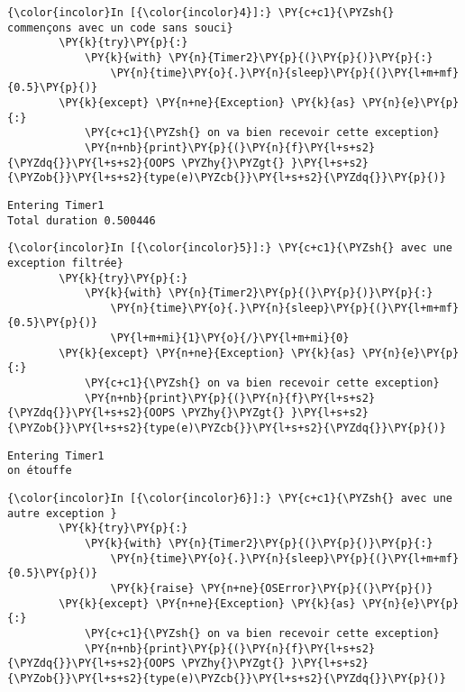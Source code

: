     \begin{Verbatim}[commandchars=\\\{\},frame=single,framerule=0.3mm,rulecolor=\color{cellframecolor}]
{\color{incolor}In [{\color{incolor}4}]:} \PY{c+c1}{\PYZsh{} commençons avec un code sans souci}
        \PY{k}{try}\PY{p}{:}
            \PY{k}{with} \PY{n}{Timer2}\PY{p}{(}\PY{p}{)}\PY{p}{:}
                \PY{n}{time}\PY{o}{.}\PY{n}{sleep}\PY{p}{(}\PY{l+m+mf}{0.5}\PY{p}{)}
        \PY{k}{except} \PY{n+ne}{Exception} \PY{k}{as} \PY{n}{e}\PY{p}{:}
            \PY{c+c1}{\PYZsh{} on va bien recevoir cette exception}
            \PY{n+nb}{print}\PY{p}{(}\PY{n}{f}\PY{l+s+s2}{\PYZdq{}}\PY{l+s+s2}{OOPS \PYZhy{}\PYZgt{} }\PY{l+s+s2}{\PYZob{}}\PY{l+s+s2}{type(e)\PYZcb{}}\PY{l+s+s2}{\PYZdq{}}\PY{p}{)}
\end{Verbatim}


    \begin{Verbatim}[commandchars=\\\{\},frame=single,framerule=0.3mm,rulecolor=\color{cellframecolor}]
Entering Timer1
Total duration 0.500446
\end{Verbatim}

    \begin{Verbatim}[commandchars=\\\{\},frame=single,framerule=0.3mm,rulecolor=\color{cellframecolor}]
{\color{incolor}In [{\color{incolor}5}]:} \PY{c+c1}{\PYZsh{} avec une exception filtrée}
        \PY{k}{try}\PY{p}{:}
            \PY{k}{with} \PY{n}{Timer2}\PY{p}{(}\PY{p}{)}\PY{p}{:}
                \PY{n}{time}\PY{o}{.}\PY{n}{sleep}\PY{p}{(}\PY{l+m+mf}{0.5}\PY{p}{)}
                \PY{l+m+mi}{1}\PY{o}{/}\PY{l+m+mi}{0}
        \PY{k}{except} \PY{n+ne}{Exception} \PY{k}{as} \PY{n}{e}\PY{p}{:}
            \PY{c+c1}{\PYZsh{} on va bien recevoir cette exception}
            \PY{n+nb}{print}\PY{p}{(}\PY{n}{f}\PY{l+s+s2}{\PYZdq{}}\PY{l+s+s2}{OOPS \PYZhy{}\PYZgt{} }\PY{l+s+s2}{\PYZob{}}\PY{l+s+s2}{type(e)\PYZcb{}}\PY{l+s+s2}{\PYZdq{}}\PY{p}{)}
\end{Verbatim}


    \begin{Verbatim}[commandchars=\\\{\},frame=single,framerule=0.3mm,rulecolor=\color{cellframecolor}]
Entering Timer1
on étouffe
\end{Verbatim}

    \begin{Verbatim}[commandchars=\\\{\},frame=single,framerule=0.3mm,rulecolor=\color{cellframecolor}]
{\color{incolor}In [{\color{incolor}6}]:} \PY{c+c1}{\PYZsh{} avec une autre exception }
        \PY{k}{try}\PY{p}{:}
            \PY{k}{with} \PY{n}{Timer2}\PY{p}{(}\PY{p}{)}\PY{p}{:}
                \PY{n}{time}\PY{o}{.}\PY{n}{sleep}\PY{p}{(}\PY{l+m+mf}{0.5}\PY{p}{)}
                \PY{k}{raise} \PY{n+ne}{OSError}\PY{p}{(}\PY{p}{)}
        \PY{k}{except} \PY{n+ne}{Exception} \PY{k}{as} \PY{n}{e}\PY{p}{:}
            \PY{c+c1}{\PYZsh{} on va bien recevoir cette exception}
            \PY{n+nb}{print}\PY{p}{(}\PY{n}{f}\PY{l+s+s2}{\PYZdq{}}\PY{l+s+s2}{OOPS \PYZhy{}\PYZgt{} }\PY{l+s+s2}{\PYZob{}}\PY{l+s+s2}{type(e)\PYZcb{}}\PY{l+s+s2}{\PYZdq{}}\PY{p}{)}
\end{Verbatim}


